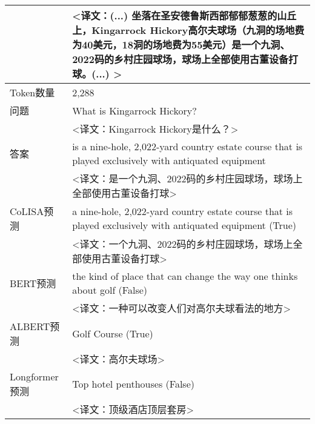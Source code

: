 \begin{table}[htbp]
\begin{tabular}{p{70pt}|p{320pt}}
         & <译文：(...) 坐落在圣安德鲁斯西部郁郁葱葱的山丘上，Kingarrock Hickory高尔夫球场（九洞的场地费为40美元，18洞的场地费为55美元）是一个九洞、2022码的乡村庄园球场，球场上全部使用古董设备打球。(...) > \\
         \hline
         Token数量 & 2,288 \\
         \hline
         问题 & What is Kingarrock Hickory? \\
         & <译文：Kingarrock Hickory是什么？> \\
         \hline
         答案 & is a nine-hole, 2,022-yard country estate course that is played exclusively with antiquated equipment \\
         & <译文：是一个九洞、2022码的乡村庄园球场，球场上全部使用古董设备打球> \\
         \hline
         CoLISA预测 & \textcolor[rgb]{1,0.4,0.3}{a nine-hole, 2,022-yard country estate course that is played exclusively with antiquated equipment (True)} \\
         & <译文：一个九洞、2022码的乡村庄园球场，球场上全部使用古董设备打球> \\
         \hline
         BERT预测 & \textcolor[rgb]{0.4,0.7,0.9}{the kind of place that can change the way one thinks about golf (False)} \\
         & <译文：一种可以改变人们对高尔夫球看法的地方> \\
         \hline
         ALBERT预测 & \textcolor[rgb]{0.4,0.7,0.9}{Golf Course (True)} \\
         & <译文：高尔夫球场> \\
         \hline
         Longformer预测 & \textcolor[rgb]{0.4,0.7,0.9}{Top hotel penthouses (False)} 
         \\
         & <译文：顶级酒店顶层套房> \\
         \hline
    \end{tabular}
    \label{tab:3-2}
\end{table}

